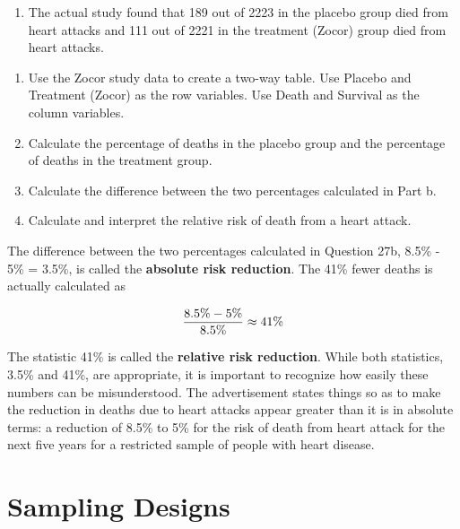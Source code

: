 \documentclass[
]{report}
\providecommand{\tightlist}{%
  \setlength{\itemsep}{0pt}\setlength{\parskip}{0pt}}
\begin{document}
\begin{enumerate}
\def\labelenumi{\arabic{enumi}.}
\setcounter{enumi}{26}
\tightlist
\item
  The actual study found that 189 out of 2223 in the placebo group died from heart attacks and 111 out of 2221 in the treatment (Zocor) group died from heart attacks.\\
\end{enumerate}

\begin{enumerate}
\def\labelenumi{\alph{enumi}.}
\tightlist
\item
  Use the Zocor study data to create a two-way table. Use Placebo and Treatment (Zocor) as the row variables. Use Death and Survival as the column variables.\\
\item
  Calculate the percentage of deaths in the placebo group and the percentage of deaths in the treatment group.\\
\item
  Calculate the difference between the two percentages calculated in Part b.\\
\item
  Calculate and interpret the relative risk of death from a heart attack.
\end{enumerate}

The difference between the two percentages calculated in Question 27b, 8.5\% - 5\% = 3.5\%, is called the \textbf{absolute risk reduction}. The 41\% fewer deaths is actually calculated as

\begin{align}
\frac{8.5\% - 5\%}{8.5\%} \approx 41\% 
\notag
\end{align}

The statistic 41\% is called the \textbf{relative risk reduction}. While both statistics, 3.5\% and 41\%, are appropriate, it is important to recognize how easily these numbers can be misunderstood. The advertisement states things so as to make the reduction in deaths due to heart attacks appear greater than it is in absolute terms: a reduction of 8.5\% to 5\% for the risk of death from heart attack for the next five years for a restricted sample of people with heart disease.

\hypertarget{sampling-designs}{%
\section{\texorpdfstring{\textbf{Sampling Designs}}{Sampling Designs}}\label{sampling-designs}}
\end{document}
